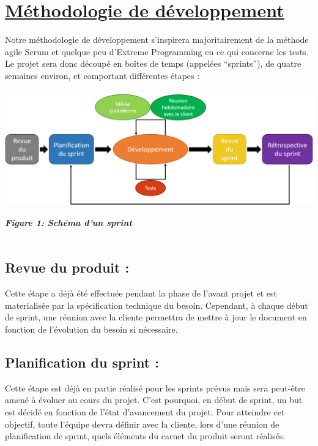 \documentclass{../res/univ-projet}
\begin{document}
\newpage

\section{\underline{Méthodologie de développement}}

Notre méthodologie de développement s'inspirera majoritairement de la méthode agile Scrum et quelque peu d'Extreme Programming en ce qui concerne les tests. 
Le projet sera donc découpé en boîtes de temps (appelées ``sprints''), de quatre semaines environ, et comportant différentes étapes : \\\\

\includegraphics[scale=0.45]{./graphics/Schema_methodologie_developpement} \\
\begin{center}
 \textbf{\textit{Figure 1: Schéma d'un sprint}} \\~\\
\end{center}


\subsection{Revue du produit :} 

Cette étape a déjà été effectuée pendant la phase de l'avant projet et est materialisée par la spécification technique du besoin. Cependant, à chaque début de 
sprint, une réunion avec la cliente permettra de mettre à jour le document en fonction de l'évolution du besoin si nécessaire.

\subsection{Planification du sprint :} 

Cette étape est déjà en partie réalisé pour les sprints prévus mais sera peut-être amené à évoluer au cours du projet. C'est pourquoi, en début de sprint, 
un but est décidé en fonction de l'état d'avancement du projet. Pour atteindre cet objectif, toute l'équipe devra définir avec la cliente, lors d'une réunion de 
planification de sprint, quels éléments du carnet du produit seront réalisés. 
\end{document}
